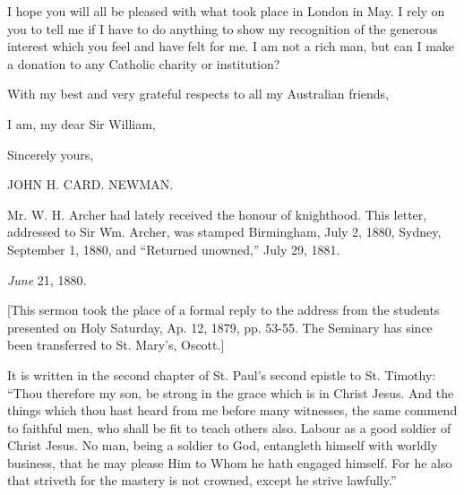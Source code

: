 I hope you will all be pleased with what took place in London in
May. I rely on you to tell me if I have to do anything to show my
recognition of the generous interest which you feel and have felt for
me. I am not a rich man, but can I make a donation to any Catholic
charity or institution?

With my best and very grateful respects to all my Australian
friends,

I am, my dear Sir William,

Sincerely yours,

JOHN H. CARD. NEWMAN.

Mr. W. H. Archer had lately received the honour of knighthood. This
letter, addressed to Sir Wm. Archer, was stamped Birmingham, July 2,
1880, Sydney, September 1, 1880, and ``Returned unowned,''
July 29, 1881.


\emph{June} 21, 1880.

[This sermon took the place of a formal reply to the
address from the students presented on Holy Saturday, Ap. 12, 1879,
pp. 53-55. The Seminary has since been transferred to St. Mary's,
Oscott.]

It is written in the second chapter of St. Paul's second epistle to
St. Timothy: ``Thou therefore my son, be strong in the grace which
is in Christ Jesus. And the things which thou hast heard from me
before many witnesses, the same commend to faithful men, who shall be
fit to teach others also. Labour as a good soldier of Christ Jesus. No
man, being a soldier to God, entangleth himself with worldly business,
that he may please Him to Whom he hath engaged himself. For he also
that striveth for the mastery is not crowned, except he strive
lawfully.''

